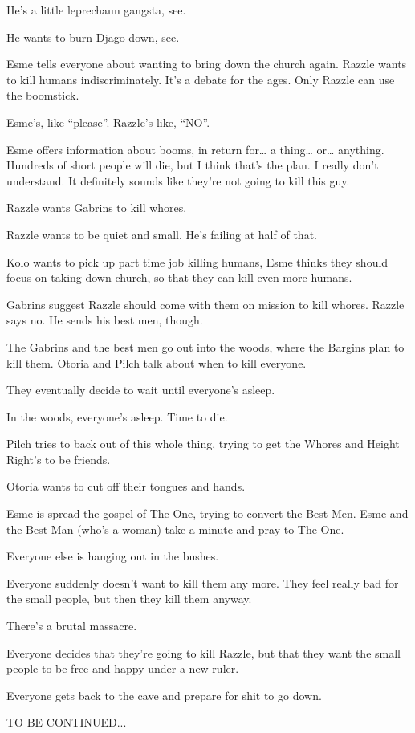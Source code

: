 He’s a little leprechaun gangsta, see.\medskip

He wants to burn Djago down, see.\medskip

Esme tells everyone about wanting to bring down the church again. Razzle wants to kill humans indiscriminately. It’s a debate for the ages. Only Razzle can use the boomstick.\medskip

Esme’s, like “please”. Razzle’s like, “NO”.\medskip

Esme offers information about booms, in return for… a thing… or… anything. Hundreds of short people will die, but I think that’s the plan. I really don’t understand. It definitely sounds like they’re not going to kill this guy.\medskip

Razzle wants Gabrins to kill whores.\medskip

Razzle wants to be quiet and small. He’s failing at half of that.\medskip

Kolo wants to pick up part time job killing humans, Esme thinks they should focus on taking down church, so that they can kill even more humans.\medskip

Gabrins suggest Razzle should come with them on mission to kill whores. Razzle says no. He sends his best men, though.\medskip

The Gabrins and the best men go out into the woods, where the Bargins plan to kill them. Otoria and Pilch talk about when to kill everyone.\medskip

They eventually decide to wait until everyone’s asleep.\medskip

In the woods, everyone’s asleep. Time to die.\medskip

Pilch tries to back out of this whole thing, trying to get the Whores and Height Right’s to be friends.\medskip

Otoria wants to cut off their tongues and hands.\medskip

Esme is spread the gospel of The One, trying to convert the Best Men. Esme and the Best Man (who’s a woman) take a minute and pray to The One.\medskip

Everyone else is hanging out in the bushes.\medskip

Everyone suddenly doesn’t want to kill them any more. They feel really bad for the small people, but then they kill them anyway.\medskip

There’s a brutal massacre.\medskip

Everyone decides that they’re going to kill Razzle, but that they want the small people to be free and happy under a new ruler.\medskip

Everyone gets back to the cave and prepare for shit to go down.\medskip

TO BE CONTINUED...



\clearpage